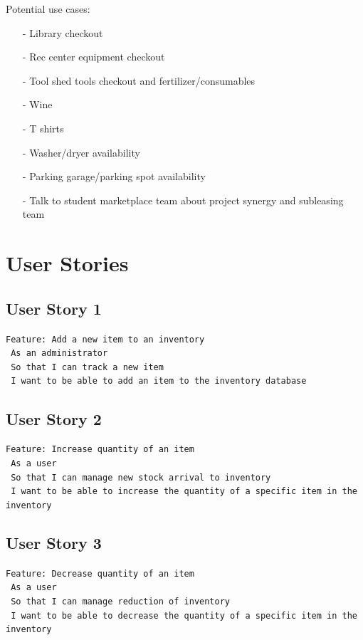 \documentclass{article}
\begin{document}
            \noindent Potential use cases:
            \begin{itemize}
                \item[-] Library checkout
                \item[-] Rec center equipment checkout
                \item[-] Tool shed tools checkout and fertilizer/consumables
                \item[-] Wine
                \item[-] T shirts
                \item[-] Washer/dryer availability
                \item[-] Parking garage/parking spot availability
                \item[-] Talk to student marketplace team about project synergy and subleasing team
            \end{itemize}
            
\pagebreak
    
    \section{User Stories}
        \subsection{User Story 1}
            \texttt{Feature: Add a new item to an inventory}\\
            \texttt{\phantom{\quad} As an administrator}\\
            \texttt{\phantom{\quad} So that I can track a new item}\\
            \texttt{\phantom{\quad} I want to be able to add an item to the inventory database}
        \subsection{User Story 2}
            \texttt{Feature: Increase quantity of an item}\\
            \texttt{\phantom{\quad} As a user}\\
            \texttt{\phantom{\quad} So that I can manage new stock arrival to inventory}\\
            \texttt{\phantom{\quad} I want to be able to increase the quantity of a specific item in the inventory}
        \subsection{User Story 3}
            \texttt{Feature: Decrease quantity of an item}\\
            \texttt{\phantom{\quad} As a user}\\
            \texttt{\phantom{\quad} So that I can manage reduction of inventory}\\
            \texttt{\phantom{\quad} I want to be able to decrease the quantity of a specific item in the inventory}
\end{document}

